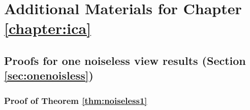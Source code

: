 
\chapter{Additional Materials for Chapter \ref{chapter:ica}}\label{chapter:appendix-ica}

\section{Proofs for one noiseless view results (Section \ref{sec:onenoisless})}
\label{appendix:thm_noiseless}

\subsection{Proof of Theorem \ref{thm:noiseless1}}\label{appendix:proof-thm1}

